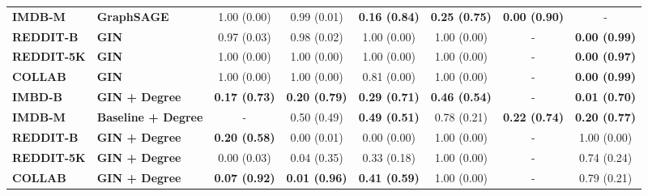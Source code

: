 \begin{table}[]
\begin{tabular}{@{}llcccccc@{}}
    \textbf{IMDB-M} & \textbf{GraphSAGE}         & 1.00 {\scriptsize (0.00)} & 0.99 {\scriptsize (0.01)}  & \textbf{0.16 {\scriptsize (0.84)}}  & \textbf{0.25 {\scriptsize (0.75)}}  & \textbf{0.00 {\scriptsize (0.90)}}  & -    \\

    \textbf{REDDIT-B} & \textbf{GIN}             & 0.97 {\scriptsize (0.03)} & 0.98 {\scriptsize (0.02)}  & 1.00 {\scriptsize (0.00)}  & 1.00 {\scriptsize (0.00)}  & -     & \textbf{0.00 {\scriptsize (0.99)}} \\

    \textbf{REDDIT-5K} & \textbf{GIN}            & 1.00 {\scriptsize (0.00)} & 1.00 {\scriptsize (0.00)}  & 1.00 {\scriptsize (0.00)}  & 1.00 {\scriptsize (0.00)}  & -     & \textbf{0.00 {\scriptsize (0.97)}} \\

    \textbf{COLLAB} & \textbf{GIN}               & 1.00 {\scriptsize (0.00)} & 1.00 {\scriptsize (0.00)}  & 0.81 {\scriptsize (0.00)}  & 1.00 {\scriptsize (0.00)}  & -     & \textbf{0.00 {\scriptsize (0.99)}} \\

    \midrule

    \textbf{IMBD-B} & \textbf{GIN + Degree}      & \textbf{0.17 {\scriptsize (0.73)}} & \textbf{0.20 {\scriptsize (0.79)}}  & \textbf{0.29 {\scriptsize (0.71)}}  &\textbf{0.46 {\scriptsize (0.54)}}  & -     & \textbf{0.01 {\scriptsize (0.70)}} \\

    \textbf{IMDB-M} & \textbf{Baseline + Degree} & -    & 0.50 {\scriptsize (0.49)}  & \textbf{0.49 {\scriptsize (0.51)}}  & 0.78 {\scriptsize (0.21)}  & \textbf{0.22 {\scriptsize (0.74)}}  & \textbf{0.20 {\scriptsize (0.77)}} \\

    \textbf{REDDIT-B} & \textbf{GIN + Degree}    & \textbf{0.20 {\scriptsize (0.58)}} & 0.00 {\scriptsize (0.01)}  & 0.00 {\scriptsize (0.00)}  & 1.00 {\scriptsize (0.00)}  & -     & 1.00 {\scriptsize (0.00)} \\

    \textbf{REDDIT-5K} & \textbf{GIN + Degree}   & 0.00 {\scriptsize (0.03)} & 0.04 {\scriptsize (0.35)}  & 0.33 {\scriptsize (0.18)}  & 1.00 {\scriptsize (0.00)}  & -     & 0.74 {\scriptsize (0.24)} \\

    \textbf{COLLAB} & \textbf{GIN + Degree}      & \textbf{0.07 {\scriptsize (0.92)}} & \textbf{0.01 {\scriptsize (0.96)}}  & \textbf{0.41 {\scriptsize (0.59)}}  & 1.00 {\scriptsize (0.00)}  & -     & 0.79 {\scriptsize (0.21)} \\

    \bottomrule
    \end{tabular}
    \end{table}